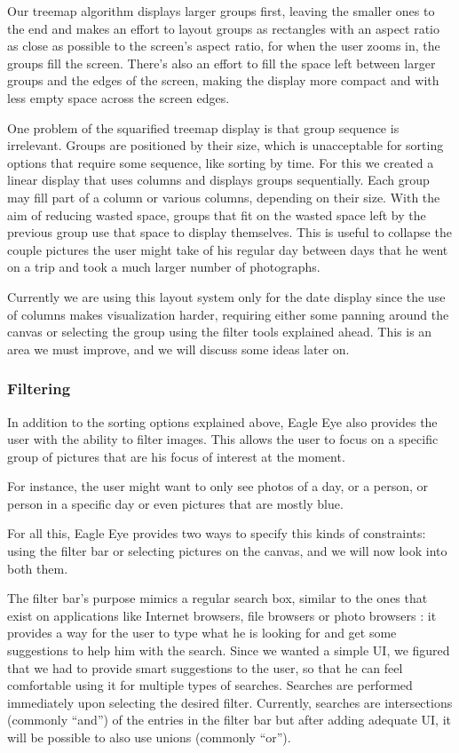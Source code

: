 Our treemap algorithm displays larger groups first, leaving the smaller ones to the end and makes an effort to layout groups as rectangles with an aspect ratio as close as possible to the screen's aspect ratio, for when the user zooms in, the groups fill the screen. There's also an effort to fill the space left between larger groups and the edges of the screen, making the display more compact and with less empty space across the screen edges.

One problem of the squarified treemap display is that group sequence is irrelevant. Groups are positioned by their size, which is unacceptable for sorting options that require some sequence, like sorting by time. For this we created a linear display that uses columns and displays groups sequentially. Each group may fill part of a column or various columns, depending on their size. With the aim of reducing wasted space, groups that fit on the wasted space left by the previous group use that space to display themselves. This is useful  to collapse the couple pictures the user might take of his regular day between days that he went on a trip and took a much larger number of photographs.

Currently we are using this layout system only for the date display since the use of columns makes visualization harder, requiring either some panning around the canvas or selecting the group using the filter tools explained ahead. This is an area we must improve, and we will discuss some ideas later on.


\subsubsection{Filtering} %

In addition to the sorting options explained above, Eagle Eye also provides the user with the ability to filter images. This allows the user to focus on a specific group of pictures that are his focus of interest at the moment.

For instance, the user might want to only see photos of a day, or a person, or person in a specific day or even pictures that are mostly blue.

For all this, Eagle Eye provides two ways to specify this kinds of constraints: using the filter bar or selecting pictures on the canvas, and we will now look into both them.

The filter bar's purpose mimics a regular search box, similar to the ones that exist on applications like Internet browsers, file browsers or photo browsers : it provides a way for the user to type what he is looking for and get some suggestions to help him with the search. Since we wanted a simple \ac{UI}, we figured that we had to provide smart suggestions to the user, so that he can feel comfortable using it for multiple types of searches. Searches are performed immediately upon selecting the desired filter. Currently, searches are intersections (commonly ``and'') of the entries in the filter bar but after adding adequate \ac{UI}, it will be possible to also use unions (commonly ``or'').

